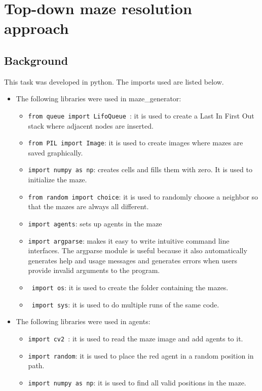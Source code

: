 \chapter{Top-down maze resolution approach}

\section{Background}

This task was developed in python. The imports used are listed below.

\begin{itemize}
\item The following libraries were used in maze\_generator:
\begin{itemize}
\item \lstinline {from queue import LifoQueue }: it is used to create a Last In First Out stack where adjacent nodes are inserted.

\item \lstinline{from PIL import Image}: 
it is used to create images where mazes are saved graphically.
\item  \lstinline{import numpy as np}: 
creates cells and fills them with zero. It is used to initialize the maze.
\item  \lstinline{from random import choice}: 
it is used to randomly choose a neighbor so that the mazes are always all different.
\item  \lstinline{import agents}: 
sets up agents in the maze

\item  \lstinline{import argparse}: makes it easy to write intuitive command line interfaces. The argparse module is useful because it also automatically generates help and usage messages and generates errors when users provide invalid arguments to the program.
\item  \lstinline{ import os}: it is used to create the folder containing the mazes.
\item  \lstinline{ import sys}: 
it is used to do multiple runs of the same code.
\end{itemize}

\item The following libraries were used in agents:
\begin{itemize}


\item \lstinline {import cv2 }: 
it is used to read the maze image and add agents to it.
\item \lstinline{import random}: it is used to place the red agent in a random position in path.
\item  \lstinline{import numpy as np}: it is used to find all valid positions in the maze.


\end{itemize}
\end{itemize}

